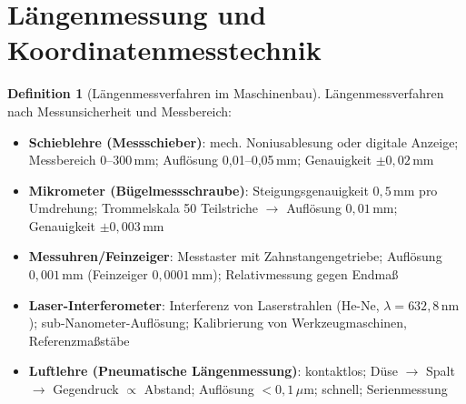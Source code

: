 ﻿\documentclass[a4paper,12pt]{report}
\theoremstyle{definition}
\newtheorem{definition}{Definition}
\begin{document}

\section{Längenmessung und Koordinatenmesstechnik}

\begin{definition}[Längenmessverfahren im Maschinenbau]
Längenmessverfahren nach Messunsicherheit und Messbereich:
\begin{itemize}
    \item[-] \textbf{Schieblehre (Messschieber)}: mech. Noniusablesung oder digitale Anzeige;
          Messbereich 0--300\,mm; Auflösung 0{,}01--0{,}05\,mm; Genauigkeit $\pm 0{,}02\,\mathrm{mm}$
    \item[-] \textbf{Mikrometer (Bügelmessschraube)}: Steigungsgenauigkeit $0{,}5\,\mathrm{mm}$
          pro Umdrehung; Trommelskala 50 Teilstriche $\to$ Auflösung $0{,}01\,\mathrm{mm}$;
          Genauigkeit $\pm 0{,}003\,\mathrm{mm}$
    \item[-] \textbf{Messuhren/Feinzeiger}: Messtaster mit Zahnstangengetriebe;
          Auflösung $0{,}001\,\mathrm{mm}$ (Feinzeiger $0{,}0001\,\mathrm{mm}$);
          Relativmessung gegen Endmaß
    \item[-] \textbf{Laser-Interferometer}: Interferenz von Laserstrahlen
          (He-Ne, $\lambda = 632{,}8\,\mathrm{nm}$); sub-Nanometer-Auflösung;
          Kalibrierung von Werkzeugmaschinen, Referenzmaßstäbe
    \item[-] \textbf{Luftlehre (Pneumatische Längenmessung)}: kontaktlos;
          Düse $\to$ Spalt $\to$ Gegendruck $\propto$ Abstand;
          Auflösung $< 0{,}1\,\mu\mathrm{m}$; schnell; Serienmessung
\end{itemize}
\end{definition}
\end{document}
